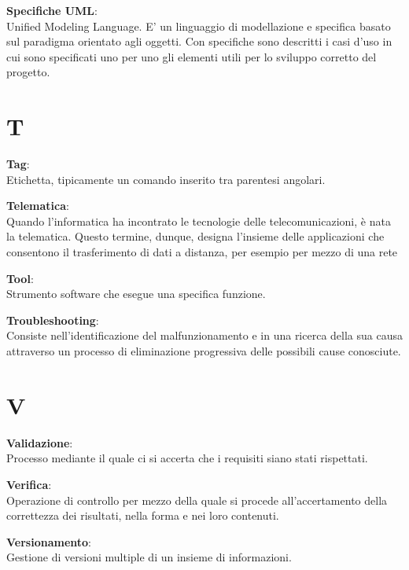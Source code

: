 \documentclass[a4paper, oneside, openany, dvipsnames, table]{article}
\begin{document}
\textbf{Specifiche UML}:\\	Unified Modeling Language. E' un linguaggio di modellazione e specifica basato sul paradigma orientato agli oggetti. Con specifiche  sono descritti i casi d'uso in cui sono specificati uno per uno gli elementi utili per lo sviluppo corretto del progetto.


\newpage
\section{T}
\textbf{Tag}:\\		Etichetta, tipicamente un comando inserito tra parentesi angolari.

\textbf{Telematica}:\\	 Quando l'informatica ha incontrato le tecnologie delle telecomunicazioni, è nata la telematica. Questo termine, dunque, designa l'insieme delle applicazioni che consentono il trasferimento di dati a distanza, per esempio per mezzo di una rete 

\textbf{Tool}:\\	Strumento software che esegue una specifica funzione.

\textbf{Troubleshooting}:\\	Consiste nell'identificazione del malfunzionamento e in una ricerca della sua causa attraverso un processo di eliminazione progressiva delle possibili cause conosciute.


\newpage
\section{V}
\textbf{Validazione}:\\	Processo mediante il quale ci si accerta che i requisiti siano stati rispettati.

\textbf{Verifica}:\\	Operazione di controllo per mezzo della quale si procede all'accertamento della correttezza dei risultati, nella forma e nei loro contenuti.

\textbf{Versionamento}:\\	Gestione di versioni multiple di un insieme di informazioni.
\end{document}
